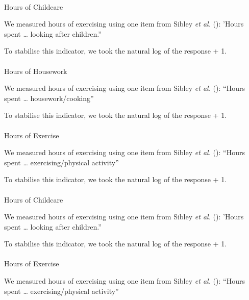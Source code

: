 \documentclass[
  single column]{article}
\makeatletter
\let\oldparagraph\paragraph
\renewcommand{\paragraph}{
    \@ifstar
      \xxxParagraphStar
      \xxxParagraphNoStar
  }
\newcommand{\xxxParagraphStar}[1]{\oldparagraph*{#1}\mbox{}}
\newcommand{\xxxParagraphNoStar}[1]{\oldparagraph{#1}\mbox{}}
\makeatother
\begin{document}
\paragraph{Hours of Childcare}\label{hours-of-childcare}

We measured hours of exercising using one item from Sibley \emph{et al.}
(): 'Hours spent \ldots{} looking after
children.''

To stabilise this indicator, we took the natural log of the response +
1.

\paragraph{Hours of Housework}\label{hours-of-housework}

We measured hours of exercising using one item from Sibley \emph{et al.}
(): ``Hours spent \ldots{}
housework/cooking''

To stabilise this indicator, we took the natural log of the response +
1.

\paragraph{Hours of Exercise}\label{hours-of-exercise}

We measured hours of exercising using one item from Sibley \emph{et al.}
(): ``Hours spent \ldots{}
exercising/physical activity''

To stabilise this indicator, we took the natural log of the response +
1.

\paragraph{Hours of Childcare}\label{hours-of-childcare-1}

We measured hours of exercising using one item from Sibley \emph{et al.}
(): 'Hours spent \ldots{} looking after
children.''

To stabilise this indicator, we took the natural log of the response +
1.

\paragraph{Hours of Exercise}\label{hours-of-exercise-1}

We measured hours of exercising using one item from Sibley \emph{et al.}
(): ``Hours spent \ldots{}
exercising/physical activity''
\end{document}
